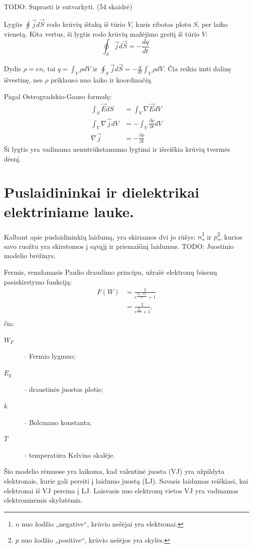 TODO: Suprasti ir sutvarkyti. (54 skaidrė)

Lygtis $\oint \vec{j} d \vec{S}$ rodo krūvių ištaką iš tūrio $V$,
kuris ribotas plotu $S$, per laiko vienetą. Kita vertus, ši
lygtis rodo krūvių mažėjimo greitį iš tūrio $V$:
\begin{equation*}
  \oint _{S} \vec{j} d \vec{S} = - \frac{dq}{dt}.
\end{equation*}

Dydis $\rho = en$, tai $q = \int_{V} \rho dV$ ir
$\oint _{S} \vec{j} d\vec{S} = - \frac{d}{dt}\int_{V} \rho dV$.
Čia reikia imti dalinę išvestinę, nes $\rho$ priklauso nuo laiko
ir koordinačių.

Pagal Ostrogradskio-Gauso formulę:
\begin{align*}
  \int _{S} \vec{E} d S &= \int _{V} \nabla \vec{E}dV \\
  \int _{V}\nabla\vec{j}dV &= -\int _{V}\frac{\partial \rho}{\partial t}dV \\
  \nabla \vec{j} &= -\frac{\partial \rho}{\partial t}
\end{align*}
Ši lygtis yra vadinama nenutrūkstamumo lygtimi ir išreiškia krūvių
tvermės dėsnį.

\section{Puslaidininkai ir dielektrikai elektriniame lauke.}

Kalbant apie puslaidininkių laidumą, yra skiriamos dvi jo rūšys:
$n$\footnote{$n$ nuo žodžio „negative“, krūvio nešėjai yra elektronai.}
ir $p$\footnote{$p$ nuo žodžio „positive“, krūvio nešėjos yra skylės.},
kurios savo ruožtu yra skirstomos į sąvąjį ir priemaišinį
laidumus. TODO: Juostinio modelio brėžinys.

Fermis, remdamasis Paulio draudimo principu, užrašė elektronų
būsenų pasiskirstymo funkciją:
\begin{align}
  F(W)
  &= \frac{1}{e^{\frac{E_{g} - W_{F}}{kT}} + 1} \\
  &= \frac{1}{e^{\frac{E_{g}}{2kT}} + 1}, \label{eq:puslaidininkai_fw}\\
\end{align}
čia:
\begin{description}
  \item[$W_{F}$] – Fermio lygmuo;
  \item[$E_{g}$] – draustinės juostos plotis;
  \item[$k$] – Bolcmano konstanta;
  \item[$T$] – temperatūra Kelvino skalėje.
\end{description}
Šio modelio rėmuose yra laikoma, kad valentinė juosta (VJ) yra
užpildyta elektronais, kurie gali pereiti į laidumo juostą (LJ).
Savasis laidumas reiškiasi, kai elektronai iš VJ pereina į LJ.
Laisvasis nuo elektronų vietos VJ yra vadinamas elektroninėmis
skylutėmis.

